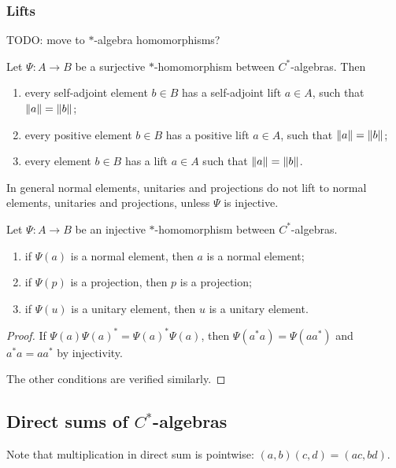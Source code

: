 \subsubsection{Lifts}
TODO: move to $*$-algebra homomorphisms?
\begin{proposition}
Let $\Psi: A \to B$ be a surjective $*$-homomorphism between $C^*$-algebras. Then
\begin{enumerate}
\item every self-adjoint element $b\in B$ has a self-adjoint lift $a\in A$, such that $\lVert a\rVert = \lVert b\rVert$;
\item every positive element $b\in B$ has a positive lift $a\in A$, such that $\lVert a\rVert = \lVert b\rVert$;
\item every element $b\in B$ has a lift $a\in A$ such that $\lVert a\rVert = \lVert b\rVert$.
\end{enumerate}
\end{proposition}
In general normal elements, unitaries and projections do not lift to normal elements, unitaries and projections, unless $\Psi$ is injective.
\begin{lemma} \label{injectiveLifts}
Let $\Psi: A \to B$ be an injective $*$-homomorphism between $C^*$-algebras.
\begin{enumerate}
\item if $\Psi(a)$ is a normal element, then $a$ is a normal element;
\item if $\Psi(p)$ is a projection, then $p$ is a projection;
\item if $\Psi(u)$ is a unitary element, then $u$ is a unitary element.
\end{enumerate}
\end{lemma}
\begin{proof}
If $\Psi(a)\Psi(a)^* = \Psi(a)^*\Psi(a)$, then $\Psi(a^*a) = \Psi(aa^*)$ and $a^*a = aa^*$ by injectivity.

The other conditions are verified similarly.
\end{proof}

\subsection{Direct sums of $C^*$-algebras}
Note that multiplication in direct sum is pointwise: $(a,b)(c,d) = (ac, bd)$.

